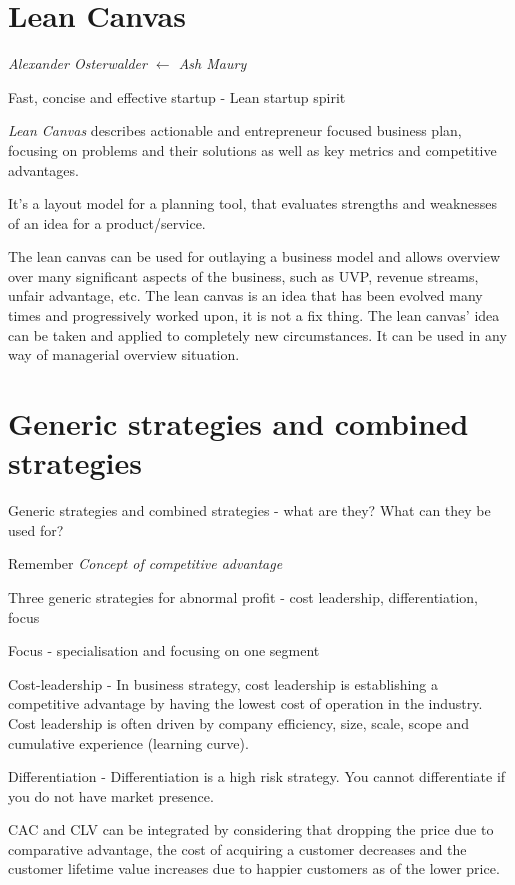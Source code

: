 \documentclass{article}
\begin{document}
\section{Lean Canvas}


\textit{Alexander Osterwalder $\leftarrow$ Ash Maury}


Fast, concise and effective startup - Lean startup spirit


\textit{Lean Canvas} describes actionable and entrepreneur focused business plan, focusing on problems and their solutions as well as key metrics and competitive advantages.


It's a layout model for a planning tool, that evaluates strengths and weaknesses of an idea for a product/service.


The lean canvas can be used for outlaying a business model and allows overview over many significant aspects of the business, such as UVP, revenue streams, unfair advantage, etc.
The lean canvas is an idea that has been evolved many times and progressively worked upon, it is not a fix thing.
The lean canvas' idea can be taken and applied to completely new circumstances. 
It can be used in any way of managerial overview situation.


\section{Generic strategies and combined strategies}


Generic strategies and combined strategies - what are they? What can they be used for?


Remember \textit{Concept of competitive advantage}


Three generic strategies for abnormal profit - cost leadership, differentiation, focus


Focus - specialisation and focusing on one segment


Cost-leadership - In business strategy, cost leadership is establishing a competitive advantage by having the lowest cost of operation in the industry.
Cost leadership is often driven by company efficiency, size, scale, scope and cumulative experience (learning curve).


Differentiation - Differentiation is a high risk strategy. 
You cannot differentiate if you do not have market presence.


CAC and CLV can be integrated by considering that dropping the price due to comparative advantage, the cost of acquiring a customer decreases and the customer lifetime value increases due to happier customers as of the lower price.
\end{document}
